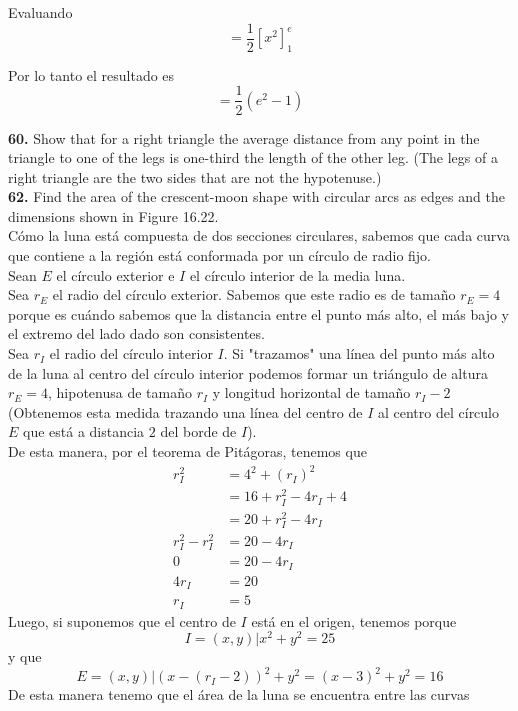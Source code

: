 \documentclass[11pt]{report}
\begin{document}
Evaluando
$$ = \frac{1}{2} \left[x^2\right]_{1}^{e}$$

Por lo tanto el resultado es
$$ = \frac{1}{2} \left(e^2 - 1\right)$$

\newpage

\textbf{60.} Show that for a right triangle the average distance from any point
in the triangle to one of the legs is one-third the length of the other leg.
(The legs of a right triangle are the two sides that are not the hypotenuse.) \\

\textbf{62.} Find the area of the crescent-moon shape with circular arcs as edges
and the dimensions shown in Figure 16.22. \\

Cómo la luna está compuesta de dos secciones circulares, sabemos que cada curva que contiene
a la región está conformada por un círculo de radio fijo.\\
Sean $E$ el círculo exterior e $I$ el círculo interior de la media luna.\\
Sea $r_E$ el radio del círculo exterior. Sabemos que este radio es de tamaño $r_E=4$ porque es cuándo
sabemos que la distancia entre el punto más alto, el más bajo y el extremo del lado dado son
consistentes. \\
Sea $r_I$ el radio del círculo interior $I$. Si "trazamos" una línea del punto más alto de la luna
al centro del círculo interior podemos formar un triángulo de altura $r_E=4$, hipotenusa de
tamaño $r_I$ y longitud horizontal de tamaño $r_I-2$ (Obtenemos esta medida trazando una línea del
centro de $I$ al centro del círculo $E$ que está a distancia $2$ del borde de $I$).\\
De esta manera, por el teorema de Pitágoras, tenemos que
\begin{equation}
	\begin{split}
		r_I^2	    &=4^2+(r_I)^2\\
			 	    &=16+r_I^2-4r_I+4\\
			 	    &=20+r_I^2-4r_I\\
		r_I^2-r_I^2 &=20-4r_I\\
		0 			&=20-4r_I\\
		4r_I		&=20\\
		r_I			&=5
	\end{split}
\end{equation}
Luego, si suponemos que el centro de $I$ está en el origen, tenemos porque
$$I={(x,y)|x^2+y^2=25}$$
y que
$$E={(x,y)|(x-(r_I-2))^2+ y^2=(x-3)^2+y^2=16}$$
De esta manera tenemo que el área de la luna se encuentra entre las curvas
\end{document}
